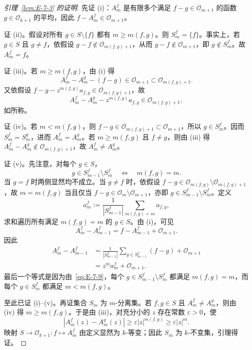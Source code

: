 \begin{proof}[引理~\ref{lem:E-7-3} 的证明]
先证 (i)：$A_m^f$ 是有限多个满足 $f-g\in\mathcal O_{m+1}$ 的函数 $g\in\mathcal O_{k+1}$ 的平均，因此 $f-A_m^f\in\mathcal O_{m+1}$。

证 (ii)。假设对所有 $g\in S\setminus\{f\}$ 都有 $m\ge m(f,g)$。则 $S_m^f=\{f\}$。事实上，若 $g\in S$ 且 $g\ne f$，依假设 $g-f\notin\mathcal O_{m(f,g)+1}$，从而 $g-f\notin\mathcal O_{m+1}$，即 $g\notin S_m^f$。故 $A_m^f=f$。

证 (iii)。若 $m\ge m(f,g)$，由 (i) 得
\[
  A_m^f-A_m^g-(f-g)\in\mathcal O_{m+1}
    \subset\mathcal O_{m(f,g)+1}.
\]
又依假设 $f-g-z^{m(f,g)}a_{f,g}\in\mathcal O_{m(f,g)+1}$，故
\[
  A_m^f-A_m^g-z^{m(f,g)}a_{f,g}
    \in\mathcal O_{m(f,g)+1},
\]
如所称。

证 (iv)。若 $m<m(f,g)$，则 $f-g\in\mathcal O_{m(f,g)+1}\subset\mathcal O_{m+1}$，所以 $g\in S_m^f$。因而 $S_m^f=S_m^g$，进而 $A_m^f=A_m^g$。若 $m\ge m(f,g)$ 且 $f\ne g$，则由 (iii) 得 $A_m^f-A_m^g\notin\mathcal O_{m(f,g)+1}$，故 $A_m^f\ne A_m^g$。

证 (v)。先注意，对每个 $g\in S$，
\begin{equation}\label{eq:E-7-9}
  g\in S_{m-1}^f\setminus S_m^f
    \quad\Longleftrightarrow\quad m(f,g)=m.
\end{equation}
当 $g=f$ 时两侧显然均不成立。当 $g\ne f$ 时，依假设 $f-g\in\mathcal O_{m(f,g)}\setminus\mathcal O_{m(f,g)+1}$，故 $m=m(f,g)$ 当且仅当 $f-g\in\mathcal O_m\setminus\mathcal O_{m+1}$，亦即 $g\in S_{m-1}^f\setminus S_m^f$。定义
\[
  a_m^f:=\frac1{|S_{m-1}^f|}
     \sum_{m(f,g)=m}a_{f,g},
\]
求和遍历所有满足 $m(f,g)=m$ 的 $g\in S$。由 (i)，可见
\[
  A_m^f-A_{m-1}^f=f-A_{m-1}^f+\mathcal O_{m+1}.
\]
因此
\begin{align*}
  A_m^f-A_{m-1}^f
  &=\frac1{|S_{m-1}^f|}
      \sum_{g\in S_{m-1}^f}(f-g)+\mathcal O_{m+1}\\
  &=z^ma_m^f+\mathcal O_{m+1}.
\end{align*}
最后一个等式是因为由~\eqref{eq:E-7-9}，每个 $g\in S_{m-1}^f\setminus S_m^f$ 都满足 $m(f,g)=m$，而每个 $g\in S_m^f$ 都满足 $m<m(f,g)$。

至此已证 (i)--(v)。再证集合 $S_m$ 为 $m$-分离集。若 $f,g\in S$ 且 $A_m^f\ne A_m^g$，则由 (iv) 得 $m\ge m(f,g)$。于是由 (iii)，对充分小的 $z$ 存在常数 $\varepsilon>0$，使
\[
  |A_m^f(z)-A_m^g(z)|
  \ge\varepsilon|z|^{m(f,g)}\ge\varepsilon|z|^m.
\]
映射 $S\to\mathcal O_{k+1}:f\mapsto A_m^f$ 由定义显然为 $k$-等变；因此 $S_m$ 为 $k$-不变集，引理得证。
\end{proof}

